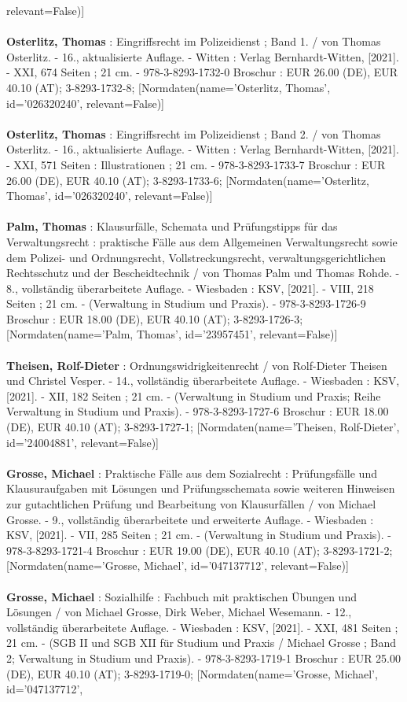\documentclass{article}
\begin{document}
\begin{multicols}{3}
relevant=False)]\\\\\textbf{Osterlitz, Thomas} : Eingriffsrecht im Polizeidienst ; Band 1. / von Thomas Osterlitz. - 16., aktualisierte Auflage. - Witten : Verlag Bernhardt-Witten, [2021]. - XXI, 674 Seiten ; 21 cm. - 978-3-8293-1732-0 Broschur : EUR 26.00 (DE), EUR 40.10 (AT); 3-8293-1732-8; [Normdaten(name='Osterlitz, Thomas', id='026320240', relevant=False)]\\\\\textbf{Osterlitz, Thomas} : Eingriffsrecht im Polizeidienst ; Band 2. / von Thomas Osterlitz. - 16., aktualisierte Auflage. - Witten : Verlag Bernhardt-Witten, [2021]. - XXI, 571 Seiten : Illustrationen ; 21 cm. - 978-3-8293-1733-7 Broschur : EUR 26.00 (DE), EUR 40.10 (AT); 3-8293-1733-6; [Normdaten(name='Osterlitz, Thomas', id='026320240', relevant=False)]\\\\\textbf{Palm, Thomas} : Klausurfälle, Schemata und Prüfungstipps für das Verwaltungsrecht : praktische Fälle aus dem Allgemeinen Verwaltungsrecht sowie dem Polizei- und Ordnungsrecht, Vollstreckungsrecht, verwaltungsgerichtlichen Rechtsschutz und der Bescheidtechnik / von Thomas Palm und Thomas Rohde. - 8., vollständig überarbeitete Auflage. - Wiesbaden : KSV, [2021]. - VIII, 218 Seiten ; 21 cm. - (Verwaltung in Studium und Praxis). - 978-3-8293-1726-9 Broschur : EUR 18.00 (DE), EUR 40.10 (AT); 3-8293-1726-3; [Normdaten(name='Palm, Thomas', id='23957451', relevant=False)]\\\\\textbf{Theisen, Rolf-Dieter} : Ordnungswidrigkeitenrecht / von Rolf-Dieter Theisen und Christel Vesper. - 14., vollständig überarbeitete Auflage. - Wiesbaden : KSV, [2021]. - XII, 182 Seiten ; 21 cm. - (Verwaltung in Studium und Praxis; Reihe Verwaltung in Studium und Praxis). - 978-3-8293-1727-6 Broschur : EUR 18.00 (DE), EUR 40.10 (AT); 3-8293-1727-1; [Normdaten(name='Theisen, Rolf-Dieter', id='24004881', relevant=False)]\\\\\textbf{Grosse, Michael} : Praktische Fälle aus dem Sozialrecht : Prüfungsfälle und Klausuraufgaben mit Lösungen und Prüfungsschemata sowie weiteren Hinweisen zur gutachtlichen Prüfung und Bearbeitung von Klausurfällen / von Michael Grosse. - 9., vollständig überarbeitete und erweiterte Auflage. - Wiesbaden : KSV, [2021]. - VII, 285 Seiten ; 21 cm. - (Verwaltung in Studium und Praxis). - 978-3-8293-1721-4 Broschur : EUR 19.00 (DE), EUR 40.10 (AT); 3-8293-1721-2; [Normdaten(name='Grosse, Michael', id='047137712', relevant=False)]\\\\\textbf{Grosse, Michael} : Sozialhilfe : Fachbuch mit praktischen Übungen und Lösungen / von Michael Grosse, Dirk Weber, Michael Wesemann. - 12., vollständig überarbeitete Auflage. - Wiesbaden : KSV, [2021]. - XXI, 481 Seiten ; 21 cm. - (SGB II und SGB XII für Studium und Praxis / Michael Grosse ; Band 2; Verwaltung in Studium und Praxis). - 978-3-8293-1719-1 Broschur : EUR 25.00 (DE), EUR 40.10 (AT); 3-8293-1719-0; [Normdaten(name='Grosse, Michael', id='047137712', 
\end{multicols}
\end{document}

